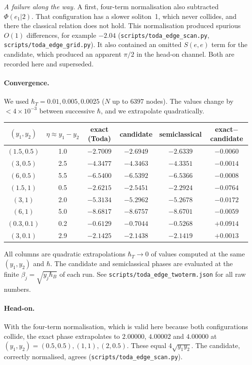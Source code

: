 \documentclass[11pt,a4paper]{article}
\newcommand{\script}[1]{\texttt{scripts/#1}}
\begin{document}
\emph{A failure along the way.} A first, four-term normalisation also subtracted $\Phi(e_1|2)$. That configuration has a slower soliton~1, which never collides, and there the classical relation does not hold. This normalisation produced spurious $O(1)$ differences, for example $-2.04$ (\script{toda\_edge\_scan.py}, \script{toda\_edge\_grid.py}). It also contained an omitted $S(e,e)$ term for the candidate, which produced an apparent $\pi/2$ in the head-on channel. Both are recorded here and superseded.

\paragraph{Convergence.} We used $\hbar_T=0.01,0.005,0.0025$ ($N$ up to $6397$ nodes). The values change by $<4\times10^{-3}$ between successive $\hbar$, and we extrapolate quadratically.

\begin{center}\small
\begin{tabular}{cccccc}\toprule
$(y_1,y_2)$ & $\eta\approx y_1-y_2$ & exact (Toda) & candidate & semiclassical & exact$-$candidate\\\midrule
$(1.5,0.5)$ & 1.0 & $-2.7009$ & $-2.6949$ & $-2.6339$ & $-0.0060$\\
$(3,0.5)$ & 2.5 & $-4.3477$ & $-4.3463$ & $-4.3351$ & $-0.0014$\\
$(6,0.5)$ & 5.5 & $-6.5400$ & $-6.5392$ & $-6.5366$ & $-0.0008$\\
$(1.5,1)$ & 0.5 & $-2.6215$ & $-2.5451$ & $-2.2924$ & $-0.0764$\\
$(3,1)$ & 2.0 & $-5.3134$ & $-5.2962$ & $-5.2678$ & $-0.0172$\\
$(6,1)$ & 5.0 & $-8.6817$ & $-8.6757$ & $-8.6701$ & $-0.0059$\\
$(0.3,0.1)$ & 0.2 & $-0.6129$ & $-0.7044$ & $-0.5268$ & $+0.0914$\\
$(3,0.1)$ & 2.9 & $-2.1425$ & $-2.1438$ & $-2.1419$ & $+0.0013$\\
\bottomrule\end{tabular}\end{center}

All columns are quadratic extrapolations $\hbar_T\to0$ of values computed at the same $(y_1,y_2)$ and $\hbar$. The candidate and semiclassical phases are evaluated at the finite $\beta_j=\sqrt{y_j\hbar_B}$ of each run. See \texttt{scripts/toda\_edge\_twoterm.json} for all raw numbers.

\paragraph{Head-on.} With the four-term normalisation, which is valid here because both configurations collide, the exact phase extrapolates to $2.00000$, $4.00002$ and $4.00000$ at $(y_1,y_2)=(0.5,0.5),(1,1),(2,0.5)$. These equal $4\sqrt{y_1y_2}$. The candidate, correctly normalised, agrees (\script{toda\_edge\_scan.py}).
\end{document}
